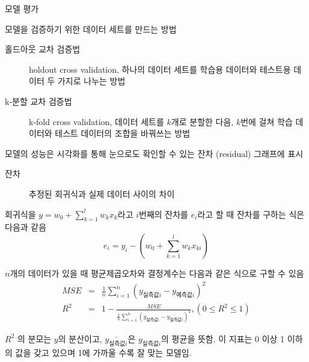 \documentclass[10pt,t]{beamer}
\begin{document}
\begin{frame} {모델 평가}

    모델을 검증하기 위한 데이터 세트를 만드는 방법
    \begin{description}
        \item[홀드아웃 교차 검증법] holdout cross validation, 하나의 데이터 세트를 학습용 데이터와 테스트용 데이터 두 가지로 나누는 방법
        \item[k-분할 교차 검증법] k-fold cross validation, 데이터 세트를 $k$개로 분할한 다음, $k$번에 걸쳐 학습 데이터와 테스트 데이터의 조합을 바꿔쓰는 방법
    \end{description}
    \pagebreak

    모델의 성능은 시각화를 통해 눈으로도 확인할 수 있는 잔차 (residual) 그래프에 표시

    \begin{description}
        \item[잔차] 추정된 회귀식과 실제 데이터 사이의 차이 
    \end{description}

    회귀식을 $y= w_0 + \sum_{k=1}^l w_k x_k$라고 $i$번째의 잔차를 $e_i$라고 할 때 잔차를 구하는 식은 다음과 같음
    \[e_i = y_i - \left(w_0 + \sum_{k=1}^l w_k x_{ki}\right)\]

\pagebreak
    $n$개의 데이터가 있을 때 평균제곱오차와 결정계수는 다음과 같은 식으로 구할 수 있음
    \begin{eqnarray*}
        MSE &=& \frac{1}{n}\sum_{i=1}^n (y_{실측값i} -y_{예측값i})^2 \\
        R^2 &=& 1 -\frac{MSE}{\frac{1}{n}\sum_{i=1}^n (y_{실측값i} - \bar{y_{실측값i}})^2}, (0 \leq R^2 \leq 1)
    \end{eqnarray*}

    $R^2$ 의 분모는 $y$의 분산이고, $\bar{y_{실측값i}}$은 $y_{실측값i}$의 평균을 뜻함. 이 지표는 0 이상 1 이하의 값을 갖고 있으며 1에 가까울 수록 잘 맞는 모델임.
\end{frame}
\end{document}
